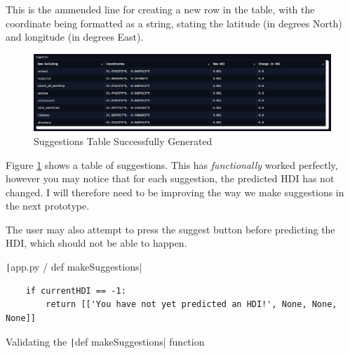 \documentclass[12pt]{report}
\newcommand{\pil}[1]{\protect\texttt|#1|}
\begin{document}
This is the ammended line for creating a new row in the table, with the coordinate being formatted as a string, stating the latitude (in degrees North) and longitude (in degrees East).

\begin{center}
\end{center}

\begin{figure}[H]
\centering
\includegraphics[width=14cm]{ss13.3.png}
\caption{Suggestions Table Successfully Generated}\label{fig:ss13.3}
\end{figure}

Figure \ref{fig:ss13.3} shows a table of suggestions. This has \textit{functionally} worked perfectly, however you may notice that for each suggestion, the predicted HDI has not changed. I will therefore need to be improving the way we make suggestions in the next prototype.

The user may also attempt to press the suggest button before predicting the HDI, which should not be able to happen.

\begin{listing}[H]
\pil{app.py / def makeSuggestions}
\begin{verbatim}
    if currentHDI == -1:
        return [['You have not yet predicted an HDI!', None, None, None]]
\end{verbatim}
\caption{Validating the \pil{def makeSuggestions} function}\label{cs:validateMakeSuggestions}
\end{listing}
\end{document}
